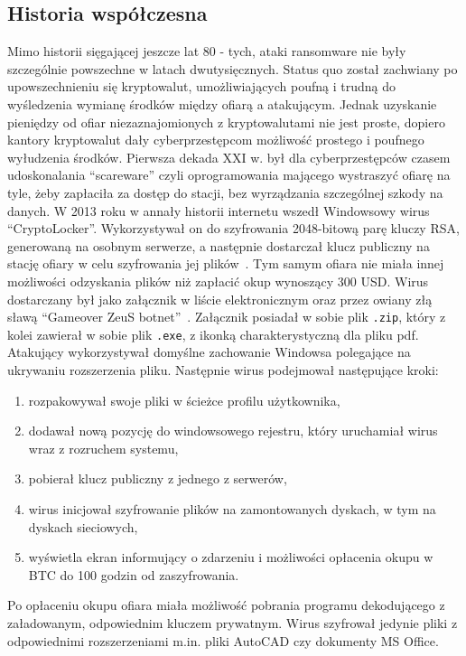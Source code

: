 \subsection{Historia współczesna}
Mimo historii sięgającej jeszcze lat 80 - tych, ataki ransomware nie były szczególnie powszechne w latach dwutysięcznych. Status quo został zachwiany po upowszechnieniu się kryptowalut, umożliwiających poufną i trudną do wyśledzenia wymianę środków między ofiarą a atakującym. Jednak uzyskanie pieniędzy od ofiar niezaznajomionych z kryptowalutami nie jest proste, dopiero kantory kryptowalut dały cyberprzestępcom możliwość prostego i poufnego wyłudzenia środków. Pierwsza dekada XXI w. był dla cyberprzestępców czasem udoskonalania \foreignquote{english}{scareware} czyli oprogramowania mającego wystraszyć ofiarę na tyle, żeby zapłaciła za dostęp do stacji, bez wyrządzania szczególnej szkody na danych. 
\newline
W 2013 roku w annały historii internetu wszedł Windowsowy wirus \foreignquote{english}{CryptoLocker}. Wykorzystywał on do szyfrowania 2048-bitową parę kluczy RSA, generowaną na osobnym serwerze, a następnie dostarczał klucz publiczny na stację ofiary w celu szyfrowania jej plików~\cite{cryptolockerfaq}. Tym samym ofiara nie miała innej możliwości odzyskania plików niż zapłacić okup wynoszący 300 USD. Wirus dostarczany był jako załącznik w liście elektronicznym oraz przez owiany złą sławą \foreignquote{english}{Gameover ZeuS botnet}~\cite{zeusbot}. Załącznik posiadał w sobie plik \texttt{.zip}, który z kolei zawierał w sobie plik \texttt{.exe}, z ikonką charakterystyczną dla pliku pdf. Atakujący wykorzystywał domyślne zachowanie Windowsa polegające na ukrywaniu rozszerzenia pliku. Następnie wirus podejmował następujące kroki:
\begin{enumerate}
    \item rozpakowywał swoje pliki w ścieżce profilu użytkownika,
    \item dodawał nową pozycję do windowsowego rejestru, który uruchamiał wirus wraz z rozruchem systemu,
    \item pobierał klucz publiczny z jednego z serwerów,
    \item wirus inicjował szyfrowanie plików na zamontowanych dyskach, w tym na dyskach sieciowych,
    \item wyświetla ekran informujący o zdarzeniu i możliwości opłacenia okupu w BTC do 100 godzin od zaszyfrowania.
\end{enumerate}
Po opłaceniu okupu ofiara miała możliwość pobrania programu dekodującego z załadowanym, odpowiednim kluczem prywatnym. Wirus szyfrował jedynie pliki z odpowiednimi rozszerzeniami m.in. pliki AutoCAD czy dokumenty MS Office.
